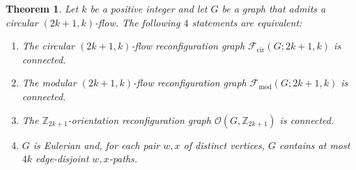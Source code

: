 \documentclass[a4paper,12pt]{article}
\theoremstyle{plain}
\newtheorem{theorem}{Theorem}[section]
\theoremstyle{definition}
\newcommand{\Z}{\mathbb{Z}}
\renewcommand\O{\mathcal{O}}
\begin{document}
\begin{theorem}
\label{thm:mod-k-orientation}
Let $k$ be a positive integer and let $G$ be a graph that admits a circular $(2k+1,k)$-flow. The following $4$ statements are equivalent:
\begin{enumerate}[label=(\roman*)]
    \item\label{Equiv1} The circular $(2k+1,k)$-flow reconfiguration graph $\mathcal{F}_{\mathrm{cir}}(G;2k+1,k)$ is connected.
    \item\label{Equiv2} The modular $(2k+1,k)$-flow reconfiguration graph $\mathcal{F}_{\mathrm{mod}}(G;2k+1,k)$ is connected.
    \item\label{Equiv3} The $\Z_{2k+1}$-orientation reconfiguration graph $\O(G,\Z_{2k+1})$ is connected.
    \item\label{Equiv4} $G$ is Eulerian and, for each pair $w,x$ of distinct vertices, $G$ contains at most $4k$ edge-disjoint $w,x$-paths.
\end{enumerate}
\end{theorem}
\end{document}
